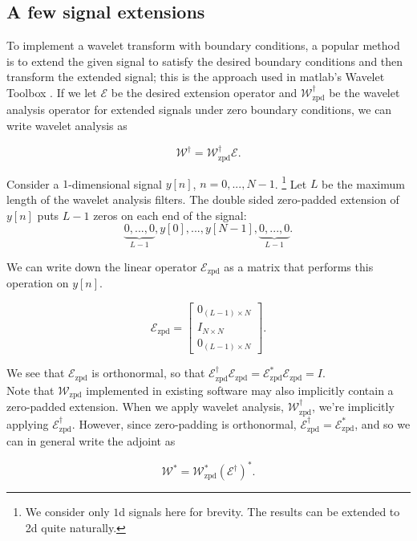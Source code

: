 \documentclass[journal]{IEEEtran}
\begin{document}
\subsection{A few signal extensions}
To implement a wavelet transform with boundary conditions, a popular method is to extend the given signal to satisfy the desired boundary conditions and then transform the extended signal; this is the approach used in {\sc matlab}'s Wavelet Toolbox \cite{matlab_wt_2015}.  If we let $\mathcal{E}$ be the desired extension operator and $\mathcal{W}^\dagger_\text{zpd}$ be the wavelet analysis operator for extended signals under zero boundary conditions, we can write wavelet analysis as 

\[ \mathcal{W}^\dagger = \mathcal{W}^\dagger_\text{zpd}\mathcal{E}. \] 

Consider a $1$-dimensional signal $y[n]$, $n=0,...,N-1$.  \footnote{We consider only $1$d signals here for brevity.  The results can be extended to 2d quite naturally.}  Let $L$ be the maximum length of the wavelet analysis filters.  The double sided zero-padded extension of $y[n]$ puts $L-1$ zeros on each end of the signal:
\[ \underbrace{0, ..., 0}_{L-1}, y[0], ..., y[N-1], \underbrace{0, ..., 0}_{L-1}. \]

\noindent We can write down the linear operator $\mathcal{E}_\text{zpd}$ as a matrix that performs this operation on $y[n]$.

\[ \mathcal{E}_\text{zpd} = \begin{bmatrix} 0_{(L-1)\times N}\\ I_{N\times N}\\ 0_{(L-1)\times N}\end{bmatrix}. \] 

   \noindent We see that $\mathcal{E}_\text{zpd}$ is orthonormal, so that ${\mathcal{E}_\text{zpd}^\dagger\mathcal{E}_\text{zpd} = \mathcal{E}_\text{zpd}^\ast\mathcal{E}_\text{zpd}=I}$.\\

   Note that $\mathcal{W}_\text{zpd}$ implemented in existing software may also implicitly contain a zero-padded extension.  When we apply wavelet analysis, $\mathcal{W}_\text{zpd}^\dagger$, we're implicitly applying $\mathcal{E}_\text{zpd}^\dagger$.  However, since zero-padding is orthonormal, $\mathcal{E}_\text{zpd}^\dagger=\mathcal{E}_\text{zpd}^\ast$, and so we can in general write the adjoint as 

\begin{equation}
\label{eq:wzpd_adjoint}
\mathcal{W}^\ast = \mathcal{W}_\text{zpd}^\ast\left(\mathcal{E}^\dagger\right)^\ast.
\end{equation}
\end{document}

